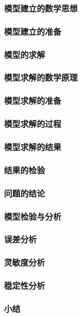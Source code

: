 \documentclass{ctexart}
\begin{document}
\subsubsection{模型建立的数学思想}
\subsubsection{模型建立的准备}
\subsubsection{模型的求解}
\subsubsection{模型求解的数学原理}
\subsubsection{模型求解的准备}
\subsubsection{模型求解的过程}
\subsubsection{模型求解的结果}
\subsubsection{结果的检验}
\subsubsection{问题的结论}
\subsubsection{模型检验与分析}
\subsubsection{误差分析}
\subsubsection{灵敏度分析}
\subsubsection{稳定性分析}
\subsubsection{小结}
\end{document}
